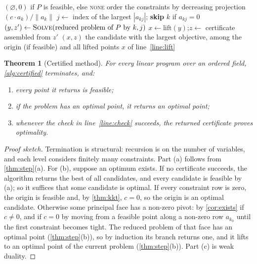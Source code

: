 \documentclass[11pt,a4paper]{article}
\theoremstyle{plain}
\newtheorem{theorem}{Theorem}
\theoremstyle{definition}
\theoremstyle{remark}
\begin{document}
\begin{algorithm}[t]
\caption{Certified principal hyperface method, $\textsc{Solve}(P)$}\label{alg:certified}
\begin{algorithmic}[1]
  \State \Return $(\varnothing,0)$ if $P$ is feasible, else \textsc{none}
\EndIf
\State order the constraints by decreasing projection $(c\cdot a_k)/\|a_k\|$
 
  \State $j\gets$ index of the largest $|a_{kj}|$; \textbf{skip} $k$ if $a_{kj}=0$
  \State $(y,z')\gets\textsc{Solve}(\text{reduced problem of }P\text{ by }k,j)$
  \State $x\gets\mathrm{lift}(y)$;\quad $z\gets$ certificate assembled from $z'$\label{line:lift}
  \label{line:check}
    \State \Return $(x,z)$ 
  \EndIf
\EndFor
\State \Return the candidate with the largest objective, among the origin (if feasible)
\Statex \hspace{\algorithmicindent}and all lifted points $x$ of line~\ref{line:lift} 
\end{algorithmic}
\end{algorithm}

\begin{theorem}[Certified method]\label{thm:certified}
For every linear program over an ordered field, \cref{alg:certified} terminates, and:
\begin{enumerate}[label=(\alph*)]
  \item every point it returns is feasible;
  \item if the problem has an optimal point, it returns an optimal point;
  \item whenever the check in line~\ref{line:check} succeeds, the returned certificate proves
  optimality.
\end{enumerate}
\end{theorem}

\begin{proof}[Proof sketch]
Termination is structural: recursion is on the number of variables, and each level considers
finitely many constraints. Part (a) follows from \cref{thm:step}(a). For (b), suppose an optimum
exists. If no certificate succeeds, the algorithm returns the best of all candidates, and every
candidate is feasible by (a); so it suffices that some candidate is optimal. If every constraint
row is zero, the origin is feasible and, by \cref{thm:kkt}, $c=0$, so the origin is an optimal
candidate. Otherwise some principal face has a non-zero pivot: by \cref{cor:exists} if $c\ne0$,
and if $c=0$ by moving from a feasible point along a non-zero row $a_{k_0}$ until the first
constraint becomes tight. The reduced problem of that face has an optimal point
(\cref{thm:step}(b)), so by induction its branch returns one, and it lifts to an optimal point of
the current problem (\cref{thm:step}(b)). Part (c) is weak duality.
\end{proof}
\end{document}
